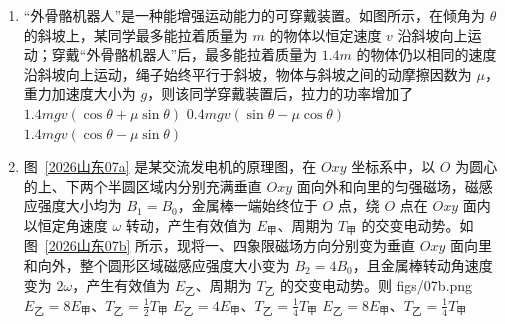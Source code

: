 \documentclass[\gkver]{gaokaozhenti}
\begin{document}
\begin{enumerate}
\item
“外骨骼机器人”是一种能增强运动能力的可穿戴装置。如图所示，在倾角为 $\theta$ 的斜坡上，某同学最多能拉着质量为 $m$ 的物体以恒定速度 $v$ 沿斜坡向上运动；穿戴“外骨骼机器人”后，最多能拉着质量为 $1.4m$ 的物体仍以相同的速度沿斜坡向上运动，绳子始终平行于斜坡，物体与斜坡之间的动摩擦因数为 $\mu$，重力加速度大小为 $g$，则该同学穿戴装置后，拉力的功率增加了 
\onepicture[w=6cm]{}
{$1.4mgv(\cos\theta + \mu\sin\theta)$}
{$0.4mgv(\sin\theta - \mu\cos\theta)$}
{$1.4mgv(\cos\theta - \mu\sin\theta)$}

\item
图~\ref{2026山东07a} 是某交流发电机的原理图，在 $Oxy$ 坐标系中，以 $O$ 为圆心的上、下两个半圆区域内分别充满垂直 $Oxy$ 面向外和向里的匀强磁场，磁感应强度大小均为 $B_{1} = B_{0}$，金属棒一端始终位于 $O$ 点，绕 $O$ 点在 $Oxy$ 面内以恒定角速度 $\omega$ 转动，产生有效值为 $E_{\text{甲}}$、周期为 $T_{\text{甲}}$ 的交变电动势。如图~\ref{2026山东07b} 所示，现将一、四象限磁场方向分别变为垂直 $Oxy$ 面向里和向外，整个圆形区域磁感应强度大小变为 $B_{2} = 4B_{0}$，且金属棒转动角速度变为 $2\omega$，产生有效值为 $E_{\text{乙}}$、周期为 $T_{\text{乙}}$ 的交变电动势。则 
{figs/07b.png}
{$E_{\text{乙}} = 8E_{\text{甲}}$、$T_{\text{乙}} = \frac{1}{2}T_{\text{甲}}$}
{$E_{\text{乙}} = 4E_{\text{甲}}$、$T_{\text{乙}} = \frac{1}{4}T_{\text{甲}}$}
{$E_{\text{乙}} = 8E_{\text{甲}}$、$T_{\text{乙}} = \frac{1}{4}T_{\text{甲}}$}
\end{enumerate}
\end{document}
